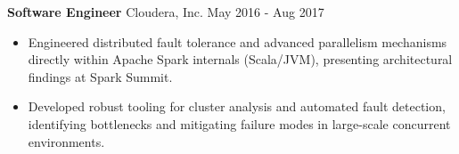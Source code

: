 \textbf{Software Engineer} Cloudera, Inc. \hfill May 2016 - Aug 2017

\begin{itemize} \itemsep -2pt

\item Engineered distributed fault tolerance and advanced parallelism mechanisms directly within Apache Spark internals (Scala/JVM), presenting architectural findings at Spark Summit.
\item Developed robust tooling for cluster analysis and automated fault detection, identifying bottlenecks and mitigating failure modes in large-scale concurrent environments.            


\end{itemize}
